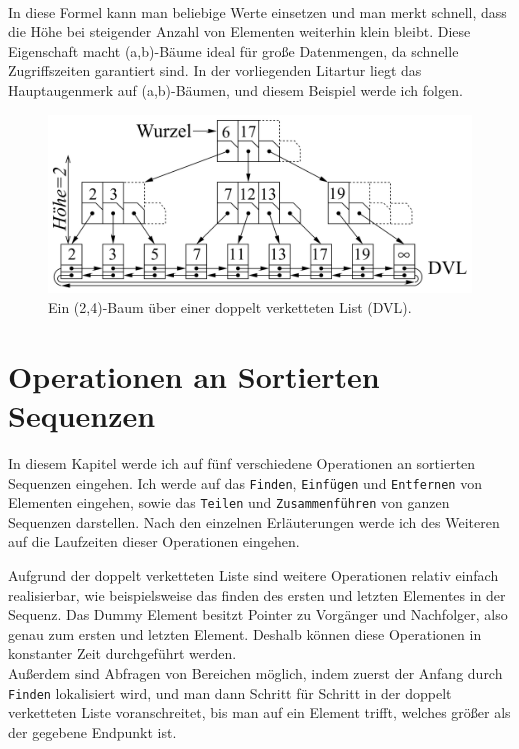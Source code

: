 \\
In diese Formel kann man beliebige Werte einsetzen und man merkt schnell, dass die Höhe bei steigender Anzahl von Elementen weiterhin klein bleibt. Diese Eigenschaft macht (a,b)-Bäume ideal für große Datenmengen, da schnelle Zugriffszeiten garantiert sind. In der vorliegenden Litartur liegt das Hauptaugenmerk auf (a,b)-Bäumen, und diesem Beispiel werde ich folgen.

\begin{figure}
    \begin{center}
        \includegraphics[width=0.7\linewidth]{assets/24tree.png}
        \caption{Ein (2,4)-Baum über einer doppelt verketteten List (DVL).\\\cite{Sanders:19}}
        \label{fig:24Tree}
    \end{center}
\end{figure}


\chapter{Operationen an Sortierten Sequenzen}
\label{chapter:operations}

In diesem Kapitel werde ich auf fünf verschiedene Operationen an sortierten Sequenzen eingehen. Ich werde auf das \texttt{Finden}, \texttt{Einfügen} und \texttt{Entfernen} von Elementen eingehen, sowie das \texttt{Teilen} und \texttt{Zusammenführen} von ganzen Sequenzen darstellen. Nach den einzelnen Erläuterungen werde ich des Weiteren auf die Laufzeiten dieser Operationen eingehen.
\par
Aufgrund der doppelt verketteten Liste sind weitere Operationen relativ einfach realisierbar, wie beispielsweise das finden des ersten und letzten Elementes in der Sequenz. Das Dummy Element besitzt Pointer zu Vorgänger und Nachfolger, also genau zum ersten und letzten Element. Deshalb können diese Operationen in konstanter Zeit durchgeführt werden.
\\
Außerdem sind Abfragen von Bereichen möglich, indem zuerst der Anfang durch \texttt{Finden} lokalisiert wird, und man dann Schritt für Schritt in der doppelt verketteten Liste voranschreitet, bis man auf ein Element trifft, welches größer als der gegebene Endpunkt ist.
\\
\cite{Sanders:19}

